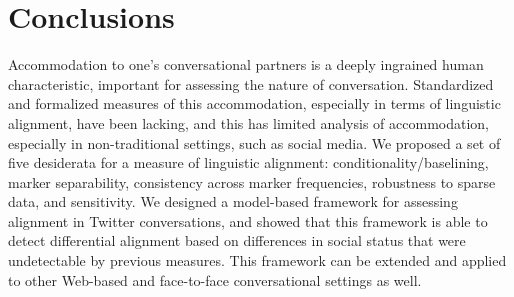 \documentclass{acm_proc_article-sp}
\begin{document}
\section{Conclusions}
Accommodation to one's conversational partners is a deeply ingrained human characteristic, important for assessing the nature of conversation.  Standardized and formalized measures of this accommodation, especially in terms of linguistic alignment, have been lacking, and this has limited analysis of accommodation, especially in non-traditional settings, such as social media.  We proposed a set of five desiderata for a measure of linguistic alignment: conditionality/baselining, marker separability, consistency across marker frequencies, robustness to sparse data, and sensitivity.  We designed a model-based framework for assessing alignment in Twitter conversations, and showed that this framework is able to detect differential alignment based on differences in social status that were undetectable by previous measures.  This framework can be extended and applied to other Web-based and face-to-face conversational settings as well.




%
\clearpage

%
%
\balancecolumns
\end{document}
